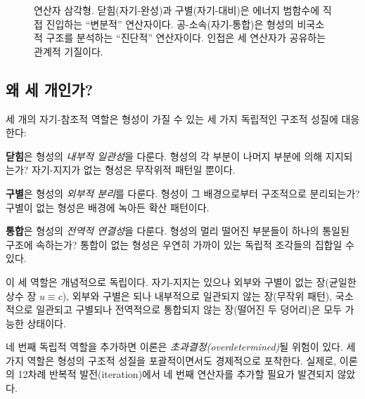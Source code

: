 \begin{figure}[t]
\centering
{}
\caption{연산자 삼각형. 닫힘(자기-완성)과 구별(자기-대비)은 에너지 범함수에 직접 진입하는 ``변분적'' 연산자이다. 공-소속(자기-통합)은 형성의 비국소적 구조를 분석하는 ``진단적'' 연산자이다. 인접은 세 연산자가 공유하는 관계적 기질이다.}
\label{fig:operator-triad}
\end{figure}


\subsection{왜 세 개인가?}

세 개의 자기-참조적 역할은 형성이 가질 수 있는 세 가지 독립적인 구조적 성질에 대응한다:

\textbf{닫힘}은 형성의 \emph{내부적 일관성}을 다룬다. 형성의 각 부분이 나머지 부분에 의해 지지되는가? 자기-지지가 없는 형성은 무작위적 패턴일 뿐이다.

\textbf{구별}은 형성의 \emph{외부적 분리}를 다룬다. 형성이 그 배경으로부터 구조적으로 분리되는가? 구별이 없는 형성은 배경에 녹아든 확산 패턴이다.

\textbf{통합}은 형성의 \emph{전역적 연결성}을 다룬다. 형성의 멀리 떨어진 부분들이 하나의 통일된 구조에 속하는가? 통합이 없는 형성은 우연히 가까이 있는 독립적 조각들의 집합일 수 있다.

이 세 역할은 개념적으로 독립이다. 자기-지지는 있으나 외부와 구별이 없는 장(균일한 상수 장 $u \equiv c$), 외부와 구별은 되나 내부적으로 일관되지 않는 장(무작위 패턴), 국소적으로 일관되고 구별되나 전역적으로 통합되지 않는 장(떨어진 두 덩어리)은 모두 가능한 상태이다.

네 번째 독립적 역할을 추가하면 이론은 \emph{초과결정(overdetermined)}될 위험이 있다. 세 가지 역할은 형성의 구조적 성질을 포괄적이면서도 경제적으로 포착한다. 실제로, 이론의 12차례 반복적 발전(iteration)에서 네 번째 연산자를 추가할 필요가 발견되지 않았다.


